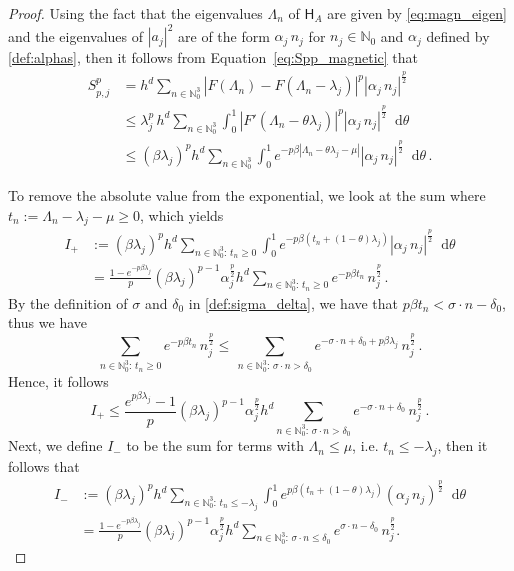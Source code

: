 \documentclass[11pt]{amsart}
\theoremstyle{plain}
\theoremstyle{definition}
\newcommand		{\N}		{\mathbb N}			%
\newcommand		\sfH		{\mathsf H}			%
\newcommand		{\lt}			{\left}				%
\newcommand		{\rt}			{\right}			%
\renewcommand	{\(}			{\lt(}
\renewcommand	{\)}			{\rt)}
\newcommand		{\n}[1]			{\lt\lvert #1 \rt\rvert}
\renewcommand		{\d}		{\mathop{}\!\mathrm{d}}		%
\newcommand		{\hd}		{h^d}
\begin{document}
	\begin{proof}
		Using the fact that the eigenvalues $\Lambda_n$ of $\sfH_A$ are given by \eqref{eq:magn_eigen}
		and the eigenvalues of $\n{a_j}^2$ are of the form $\alpha_j \,n_j$ for $n_j\in\N_0$ and $\alpha_j$ defined by \eqref{def:alphas}, then it follows from Equation~\eqref{eq:Spp_magnetic} that
		\begin{align*}
			S_{p, j}^p &= \hd \sum_{n\in\N_0^3}\n{F(\Lambda_n) - F(\Lambda_n-\lambda_j)}^p \n{\alpha_j\, n_j}^\frac{p}{2}
			\\
			&\leq \lambda_j^p\,\hd \sum_{n\in\N_0^3} \int_0^1 \n{F'(\Lambda_n-\theta\lambda_j)}^p \n{\alpha_j\, n_j}^\frac{p}{2} \d \theta\,\\
            &\leq \lt(\beta \lambda_j\rt)^p\hd \sum_{n\in\N_0^3} \int_0^1 e^{-p\beta\n{\Lambda_n-\theta\lambda_j-\mu}} \n{\alpha_j\, n_j}^\frac{p}{2} \d \theta \, .
		\end{align*}
		
		To remove the absolute value from the exponential, we look at the sum where $t_n := \Lambda_n-\lambda_j-\mu \geq 0$, which yields
        \begin{align*}
			I_+ &:= \lt(\beta \lambda_j\rt)^p \hd \sum_{n\in\N_0^3:\, t_n\geq 0} \int_0^1 e^{-p\beta\lt(t_n+\lt(1-\theta\rt)\lambda_j\rt)} \n{\alpha_j\, n_j}^\frac{p}{2} \d \theta
			\\
			&= \frac{1-e^{-p\beta\lambda_j}}{p} \lt(\beta \lambda_j\rt)^{p-1} \alpha_j^{\frac{p}{2}}\hd \sum_{n\in\N_0^3:\, t_n\geq 0} e^{-p\beta t_n}\, n_j^\frac{p}{2}\,.
        \end{align*}
		By the definition of $\sigma$ and $\delta_0$ in \eqref{def:sigma_delta}, we have that $p\beta t_n <\sigma\cdot n -\delta_0$, thus we have
		\begin{equation*}
			\sum_{n\in\N_0^3:\, t_n\geq 0} e^{-p\beta t_n}\, n_j^\frac{p}{2} 
            \le\, \sum_{n\in\N_0^3:\, \sigma\cdot n > \delta_0} e^{-\sigma\cdot n +\delta_0+p\beta\lambda_j}\, n_j^\frac{p}{2}\,.
		\end{equation*}
        Hence, it follows 
        \begin{equation*}
            I_+\le \frac{e^{p\beta\lambda_j}-1}{p} \lt(\beta \lambda_j\rt)^{p-1} \alpha_j^{\frac{p}{2}}\hd \sum_{n\in\N_0^3:\, \sigma\cdot n >\delta_0} e^{-\sigma\cdot n +\delta_0}\, n_j^\frac{p}{2}\,.
        \end{equation*}
		Next, we define $I_-$ to be the sum for terms with $\Lambda_n \leq \mu$, i.e. $t_n \leq - \lambda_j$, then it follows that
        \begin{equation}
        \begin{aligned}
            I_- &:= \lt(\beta \lambda_j\rt)^p \hd \sum_{n\in\N_0^3:\,t_n\leq -\lambda_j} \int_0^1 e^{p\beta\lt(t_n+\lt(1-\theta\rt)\lambda_j\rt)} (\alpha_j\, n_j)^\frac{p}{2} \d \theta
			\\
			&= \frac{1-e^{-p\beta\lambda_j}}{p} \lt(\beta \lambda_j\rt)^{p-1} \alpha_j^{\frac{p}{2}} \hd \sum_{n\in\N_0^3:\,\sigma\cdot n\leq \delta_0} e^{\sigma\cdot n-\delta_0}\, n_j^\frac{p}{2}.
        \end{aligned}
        \end{equation}
        

\end{proof}
\end{document}
